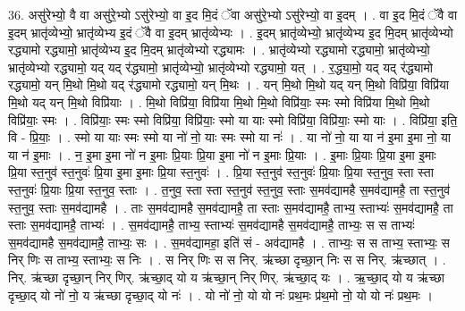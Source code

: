 \documentclass[17pt]{extarticle}
\begin{document}
36. असु॑रेभ्यो॒ वै वा असु॑रे॒भ्यो ऽसु॑रेभ्यो॒ वा इ॒द मि॒दं ॅवा असु॑रे॒भ्यो ऽसु॑रेभ्यो॒ वा इ॒दम् । . वा इ॒द मि॒दं ॅवै वा इ॒दम् भ्रातृ॑व्येभ्यो॒ भ्रातृ॑व्येभ्य इ॒दं ॅवै वा इ॒दम् भ्रातृ॑व्येभ्यः । . इ॒दम् भ्रातृ॑व्येभ्यो॒ भ्रातृ॑व्येभ्य इ॒द मि॒दम् भ्रातृ॑व्येभ्यो रद्ध्यामो रद्ध्यामो॒ भ्रातृ॑व्येभ्य इ॒द मि॒दम् भ्रातृ॑व्येभ्यो रद्ध्यामः । . भ्रातृ॑व्येभ्यो रद्ध्यामो रद्ध्यामो॒ भ्रातृ॑व्येभ्यो॒ भ्रातृ॑व्येभ्यो रद्ध्यामो॒ यद् यद् र॑द्ध्यामो॒ भ्रातृ॑व्येभ्यो॒ भ्रातृ॑व्येभ्यो रद्ध्यामो॒ यत् । . र॒द्ध्या॒मो॒ यद् यद् र॑द्ध्यामो रद्ध्यामो॒ यन् मि॒थो मि॒थो यद् र॑द्ध्यामो रद्ध्यामो॒ यन् मि॒थः । . यन् मि॒थो मि॒थो यद् यन् मि॒थो विप्रि॑या॒ विप्रि॑या मि॒थो यद् यन् मि॒थो विप्रि॑याः । . मि॒थो विप्रि॑या॒ विप्रि॑या मि॒थो मि॒थो विप्रि॑याः॒ स्मः स्मो विप्रि॑या मि॒थो मि॒थो विप्रि॑याः॒ स्मः । . विप्रि॑याः॒ स्मः स्मो विप्रि॑या॒ विप्रि॑याः॒ स्मो या याः स्मो विप्रि॑या॒ विप्रि॑याः॒ स्मो याः । . विप्रि॑या॒ इति॒ वि - प्रि॒याः॒ । . स्मो या याः स्मः स्मो या नो॑ नो॒ याः स्मः स्मो या नः॑ । . या नो॑ नो॒ या या न॑ इ॒मा इ॒मा नो॒ या या न॑ इ॒माः । . न॒ इ॒मा इ॒मा नो॑ न इ॒माः प्रि॒याः प्रि॒या इ॒मा नो॑ न इ॒माः प्रि॒याः । . इ॒माः प्रि॒याः प्रि॒या इ॒मा इ॒माः प्रि॒या स्त॒नुव॑ स्त॒नुवः॑ प्रि॒या इ॒मा इ॒माः प्रि॒या स्त॒नुवः॑ । . प्रि॒या स्त॒नुव॑ स्त॒नुवः॑ प्रि॒याः प्रि॒या स्त॒नुव॒ स्ता स्ता स्त॒नुवः॑ प्रि॒याः प्रि॒या स्त॒नुव॒ स्ताः । . त॒नुव॒ स्ता स्ता स्त॒नुव॑ स्त॒नुव॒ स्ताः स॒मव॑द्यामहै स॒मव॑द्यामहै॒ ता स्त॒नुव॑ स्त॒नुव॒ स्ताः स॒मव॑द्यामहै । . ताः स॒मव॑द्यामहै स॒मव॑द्यामहै॒ ता स्ताः स॒मव॑द्यामहै॒ ताभ्य॒ स्ताभ्यः॑ स॒मव॑द्यामहै॒ ता स्ताः स॒मव॑द्यामहै॒ ताभ्यः॑ । . स॒मव॑द्यामहै॒ ताभ्य॒ स्ताभ्यः॑ स॒मव॑द्यामहै स॒मव॑द्यामहै॒ ताभ्यः॒ स स ताभ्यः॑ स॒मव॑द्यामहै स॒मव॑द्यामहै॒ ताभ्यः॒ सः । . स॒मव॑द्यामहा॒ इति॑ सं - अव॑द्यामहै । . ताभ्यः॒ स स ताभ्य॒ स्ताभ्यः॒ स निर् णिः स ताभ्य॒ स्ताभ्यः॒ स निः । . स निर् णिः स स निर्. ऋ॑च्छा दृच्छा॒न् निः स स निर्. ऋ॑च्छात् । . निर्. ऋ॑च्छा दृच्छा॒न् निर् णिर्. ऋ॑च्छा॒द् यो य ऋ॑च्छा॒न् निर् णिर्. ऋ॑च्छा॒द् यः । . ऋ॒च्छा॒द् यो य ऋ॑च्छा दृच्छा॒द् यो नो॑ नो॒ य ऋ॑च्छा दृच्छा॒द् यो नः॑ । . यो नो॑ नो॒ यो यो नः॑ प्रथ॒मः प्र॑थ॒मो नो॒ यो यो नः॑ प्रथ॒मः । \newline
\pagebreak
{}
\end{document}
